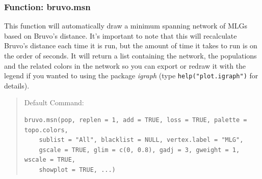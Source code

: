 \documentclass[letterpaper]{article}\usepackage[]{graphicx}\usepackage[]{color}
\makeatletter
\newenvironment{kframe}{%
 \def\at@end@of@kframe{}%
 \ifinner\ifhmode%
  \def\at@end@of@kframe{\end{minipage}}%
  \begin{minipage}{\columnwidth}%
 \fi\fi%
 \def\FrameCommand##1{\hskip\@totalleftmargin \hskip-\fboxsep
 \colorbox{shadecolor}{##1}\hskip-\fboxsep
     \hskip-\linewidth \hskip-\@totalleftmargin \hskip\columnwidth}%
 \MakeFramed {\advance\hsize-\width
   \@totalleftmargin\z@ \linewidth\hsize
   \@setminipage}}%
 {\par\unskip\endMakeFramed%
 \at@end@of@kframe}
\newenvironment{knitrout}{}{} %
\newcommand{\tab}{\hspace*{1em}}
\makeatother
\begin{document}
\subsubsection{Function: bruvo.msn}
\label{index:trees:bruvo.msn}
\tab\tab This function will automatically draw a minimum spanning network of MLGs based on Bruvo's distance. It's important to note that this will recalculate Bruvo's distance each time it is run, but the amount of time it takes to run is on the order of seconds. It will return a list containing the network, the populations and the related colors in the network so you can export or redraw it with the legend if you wanted to using the package \textit{igraph} (type \texttt{help("plot.igraph")} for details).
\begin{quote}
Default Command:
\begin{knitrout}
\color{fgcolor}\begin{kframe}
\begin{verbatim}
bruvo.msn(pop, replen = 1, add = TRUE, loss = TRUE, palette = topo.colors, 
    sublist = "All", blacklist = NULL, vertex.label = "MLG", 
    gscale = TRUE, glim = c(0, 0.8), gadj = 3, gweight = 1, wscale = TRUE, 
    showplot = TRUE, ...)
\end{verbatim}
\end{kframe}
\end{knitrout}

\end{quote}
\end{document}
